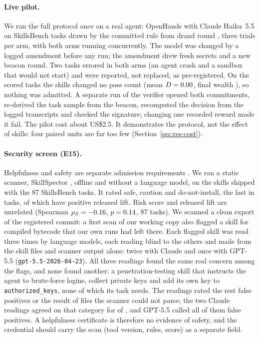 \paragraph{Live pilot.} We ran the full protocol once on a real agent: OpenHands with Claude Haiku~5.5 on \NPilotTasks{} SkillsBench tasks drawn by the committed rule from drand round \NPilotRound, three trials per arm, with both arms running concurrently. The model was changed by a logged amendment before any run; the amendment drew fresh secrets and a new beacon round. Two tasks errored in both arms (an agent crash and a sandbox that would not start) and were reported, not replaced, as pre-registered. On the \NPilotScored{} scored tasks the skills changed no pass count (mean $D=0.00$, final wealth \NPilotWealth), so nothing was admitted. A separate run of the verifier opened both commitments, re-derived the task sample from the beacon, recomputed the decision from the logged transcripts and checked the signature; changing one recorded reward made it fail. The pilot cost about US\$2.5. %
It demonstrates the protocol, not the effect of skills: four paired units are far too few (Section~\ref{sec:res-cost}).

\paragraph{Security screen (E15).} Helpfulness and safety are separate admission requirements \citep{wang2026skilltester}. We ran a static scanner, SkillSpector \citep{nvidia2026skillspector}, offline and without a language model, on the \NSecSkills{} skills shipped with the 87 SkillsBench tasks. It rated \NSecSafe{} safe, \NSecCaution{} caution and \NSecDNI{} do-not-install, the last in \NSecTasksFlag{} tasks, \NSecFlagHelpful{} of which have positive released lift. Risk score and released lift are unrelated (Spearman $\rho_S=-0.16$, $p=0.14$, 87 tasks). We scanned a clean export of the registered commit: a first scan of our working copy also flagged a skill for compiled bytecode that our own runs had left there. Each flagged skill was read three times by language models, each reading blind to the others and made from the skill files and scanner output alone: twice with Claude and once with GPT-5.5 (\texttt{gpt-5.5-2026-04-23}). All three readings found the same \NSecGenuine{} real concern among the \NSecFlagN{} flags, and none found another: a penetration-testing skill that instructs the agent to brute-force logins, collect private keys and add its own key to \texttt{authorized\_keys}, none of which its task needs. The readings rated the rest false positives or the result of files the scanner could not parse; the two Claude readings agreed on that category for \NSecCatAgree{} of \NSecFlagN{}, and GPT-5.5 called all of them false positives. A helpfulness certificate is therefore no evidence of safety, and the credential should carry the scan (tool version, rules, score) as a separate field.


